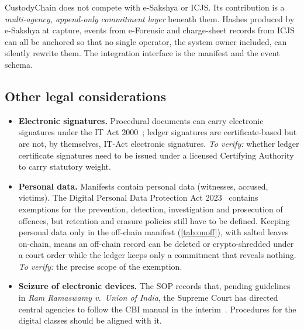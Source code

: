 \begin{keypoint}[Positioning]
CustodyChain does not compete with e-Sakshya or ICJS. Its contribution is a \emph{multi-agency, append-only commitment layer} beneath them. Hashes produced by e-Sakshya at capture, events from e-Forensic and charge-sheet records from ICJS can all be anchored so that no single operator, the system owner included, can silently rewrite them. The integration interface is the manifest and the event schema.
\end{keypoint}

\subsection{Other legal considerations}
\begin{itemize}
  \item \textbf{Electronic signatures.} Procedural documents can carry electronic signatures under the IT Act 2000~\cite{itact2000}; ledger signatures are certificate-based but are not, by themselves, IT-Act electronic signatures. \emph{To verify:} whether ledger certificate signatures need to be issued under a licensed Certifying Authority to carry statutory weight.
  \item \textbf{Personal data.} Manifests contain personal data (witnesses, accused, victims). The Digital Personal Data Protection Act 2023~\cite{dpdp2023} contains exemptions for the prevention, detection, investigation and prosecution of offences, but retention and erasure policies still have to be defined. Keeping personal data only in the off-chain manifest (\cref{tab:onoff}), with salted leaves on-chain, means an off-chain record can be deleted or crypto-shredded under a court order while the ledger keeps only a commitment that reveals nothing. \emph{To verify:} the precise scope of the exemption.
  \item \textbf{Seizure of electronic devices.} The SOP records that, pending guidelines in \emph{Ram Ramaswamy v.\ Union of India}, the Supreme Court has directed central agencies to follow the CBI manual in the interim~\cite{sopbnss}. Procedures for the digital classes should be aligned with it.
\end{itemize}
